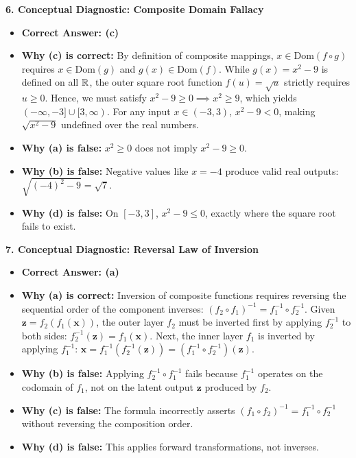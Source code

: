 \textbf{6. Conceptual Diagnostic: Composite Domain Fallacy}
\begin{itemize}
    \item \textbf{Correct Answer: (c)}
    \item \textbf{Why (c) is correct:} By definition of composite mappings, $x \in \text{Dom}(f \circ g)$ requires $x \in \text{Dom}(g)$ and $g(x) \in \text{Dom}(f)$. While $g(x) = x^2 - 9$ is defined on all $\mathbb{R}$, the outer square root function $f(u) = \sqrt{u}$ strictly requires $u \ge 0$. Hence, we must satisfy $x^2 - 9 \ge 0 \implies x^2 \ge 9$, which yields $(-\infty, -3] \cup [3, \infty)$. For any input $x \in (-3, 3)$, $x^2 - 9 < 0$, making $\sqrt{x^2 - 9}$ undefined over the real numbers.
    \item \textbf{Why (a) is false:} $x^2 \ge 0$ does not imply $x^2 - 9 \ge 0$.
    \item \textbf{Why (b) is false:} Negative values like $x = -4$ produce valid real outputs: $\sqrt{(-4)^2 - 9} = \sqrt{7}$.
    \item \textbf{Why (d) is false:} On $[-3, 3]$, $x^2 - 9 \le 0$, exactly where the square root fails to exist.
\end{itemize}

\textbf{7. Conceptual Diagnostic: Reversal Law of Inversion}
\begin{itemize}
    \item \textbf{Correct Answer: (a)}
    \item \textbf{Why (a) is correct:} Inversion of composite functions requires reversing the sequential order of the component inverses: $(f_2 \circ f_1)^{-1} = f_1^{-1} \circ f_2^{-1}$. Given $\mathbf{z} = f_2(f_1(\mathbf{x}))$, the outer layer $f_2$ must be inverted first by applying $f_2^{-1}$ to both sides: $f_2^{-1}(\mathbf{z}) = f_1(\mathbf{x})$. Next, the inner layer $f_1$ is inverted by applying $f_1^{-1}$: $\mathbf{x} = f_1^{-1}(f_2^{-1}(\mathbf{z})) = (f_1^{-1} \circ f_2^{-1})(\mathbf{z})$.
    \item \textbf{Why (b) is false:} Applying $f_2^{-1} \circ f_1^{-1}$ fails because $f_1^{-1}$ operates on the codomain of $f_1$, not on the latent output $\mathbf{z}$ produced by $f_2$.
    \item \textbf{Why (c) is false:} The formula incorrectly asserts $(f_1 \circ f_2)^{-1} = f_1^{-1} \circ f_2^{-1}$ without reversing the composition order.
    \item \textbf{Why (d) is false:} This applies forward transformations, not inverses.
\end{itemize}

